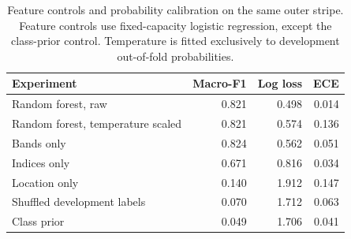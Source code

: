 \begin{table}[tbp]\centering\small
\caption{Feature controls and probability calibration on the same outer stripe. Feature controls use fixed-capacity logistic regression, except the class-prior control. Temperature is fitted exclusively to development out-of-fold probabilities.}\label{tab:diagnostics}
\begin{tabular}{p{.49\linewidth}rrr}\toprule
Experiment & Macro-F1 & Log loss & ECE \\\midrule
Random forest, raw & 0.821 & 0.498 & 0.014 \\
Random forest, temperature scaled & 0.821 & 0.574 & 0.136 \\
\midrule
Bands only & 0.824 & 0.562 & 0.051 \\
Indices only & 0.671 & 0.816 & 0.034 \\
Location only & 0.140 & 1.912 & 0.147 \\
Shuffled development labels & 0.070 & 1.712 & 0.063 \\
Class prior & 0.049 & 1.706 & 0.041 \\
\bottomrule\end{tabular}
\end{table}
